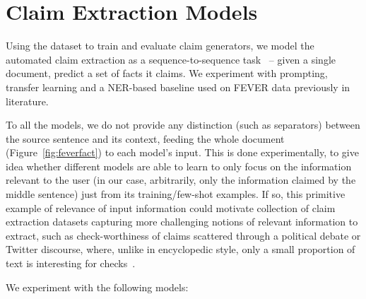 \section{Claim Extraction Models}\label{sec:methods}
Using the \ds{} dataset to train and evaluate claim generators, we model the automated claim extraction as a  sequence-to-sequence task~\cite{sutskever-2014} -- given a single \ds{} document, predict a set of facts it claims.
We experiment with prompting, transfer learning and a NER-based baseline used on FEVER data previously in literature.

To all the models, we do not provide any distinction (such as separators) between the \ds{} source sentence and its context, feeding the whole \ds{} document (Figure~\ref{fig:feverfact}) to each model's input.
This is done experimentally, to give idea whether different models are able to learn to only focus on the information relevant to the user (in our case, arbitrarily, only the information claimed by the middle sentence) just from its training/few-shot examples.
If so, this primitive example of  relevance of input information could motivate collection of claim extraction datasets capturing more challenging notions of relevant information to extract, such as check-worthiness of claims scattered through a political debate or Twitter discourse, where, unlike in encyclopedic style, only a small proportion of text is interesting for checks~\cite{10.1007/978-3-031-28241-6_59}. 

We experiment with the following models:

